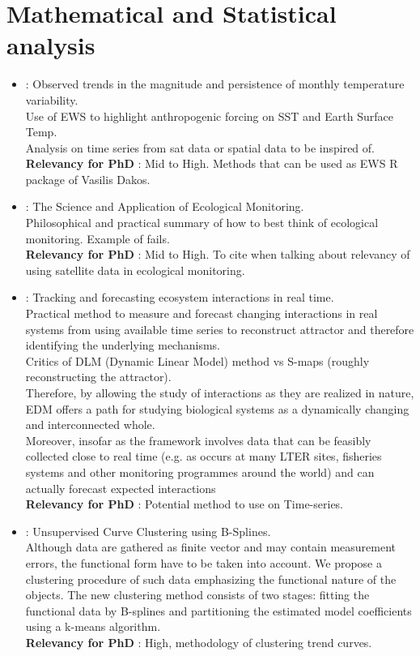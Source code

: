 \documentclass[]{report}
\begin{document}
	\section{Mathematical and Statistical analysis}
\begin{itemize}
	
		\item \cite{lenton2017observed} : Observed trends in the magnitude and persistence of monthly temperature variability.
		\\ Use of EWS to highlight anthropogenic forcing on SST and Earth Surface Temp.
		\\ Analysis on time series from sat data or spatial data to be inspired of.
		\\\textbf{Relevancy for PhD} : Mid to High. Methods that can be used as EWS R package of Vasilis Dakos.
	
		\item \cite{lindenmayer2010science} : The Science and Application of Ecological Monitoring.
		\\ Philosophical and practical summary of how to best think of ecological monitoring. Example of fails.
		\\\textbf{Relevancy for PhD} : Mid to High. To cite when talking about relevancy of using satellite data in ecological monitoring.
	
		\item \cite{deyle2016tracking} : Tracking and forecasting ecosystem interactions in real time.
		\\ Practical method to measure and forecast changing interactions in real systems from using available time series to reconstruct attractor and therefore identifying the underlying mechanisms.
		\\Critics of DLM (Dynamic Linear Model) method vs S-maps (roughly reconstructing the attractor).
		\\ Therefore, by allowing the study of interactions as they are realized in nature, EDM offers a path for studying biological systems as a dynamically changing and interconnected whole.
		\\ Moreover, insofar as the framework involves data that can be feasibly collected close to real time (e.g. as occurs at many LTER sites, fisheries systems and other monitoring programmes around the world) and can actually forecast expected interactions
		\\\textbf{Relevancy for PhD} : Potential method to use on Time-series.
	
	
		\item \cite{abraham2003unsupervised} : Unsupervised Curve Clustering using B-Splines.
		\\ Although data are gathered as finite vector and may contain measurement
		errors, the functional form have to be taken into account. We propose a clustering procedure of
		such data emphasizing the functional nature of the objects. The new clustering method consists of
		two stages: fitting the functional data by B-splines and partitioning the estimated model coefficients
		using a k-means algorithm.
	\\\textbf{Relevancy for PhD} : High, methodology of clustering trend curves.
	

\end{itemize}
\end{document}
